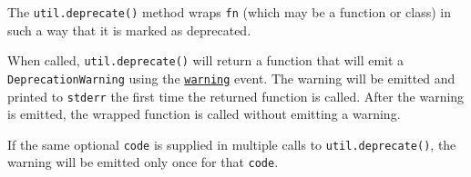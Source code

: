 The \texttt{util.deprecate()} method wraps \texttt{fn} (which may be a
function or class) in such a way that it is marked as deprecated.

\begin{Shaded}
\begin{Highlighting}[]
\OperatorTok{=} \NormalTok{(}\NormalTok{)}\OperatorTok{;}

 \OperatorTok{=}\NormalTok{(() }\KeywordTok{=\textgreater{}}\NormalTok{ \{}
\NormalTok{\}}\OperatorTok{,} \NormalTok{)}\OperatorTok{;}
\end{Highlighting}
\end{Shaded}

When called, \texttt{util.deprecate()} will return a function that will
emit a \texttt{DeprecationWarning} using the
\href{process.md\#event-warning}{\texttt{\textquotesingle{}warning\textquotesingle{}}}
event. The warning will be emitted and printed to \texttt{stderr} the
first time the returned function is called. After the warning is
emitted, the wrapped function is called without emitting a warning.

If the same optional \texttt{code} is supplied in multiple calls to
\texttt{util.deprecate()}, the warning will be emitted only once for
that \texttt{code}.

\begin{Shaded}
\begin{Highlighting}[]
\OperatorTok{=} \NormalTok{(}\NormalTok{)}\OperatorTok{;}

\OperatorTok{=}\OperatorTok{,}\OperatorTok{,} \NormalTok{)}\OperatorTok{;}
\OperatorTok{=}\OperatorTok{,}\OperatorTok{,} \NormalTok{)}\OperatorTok{;}
\NormalTok{()}\OperatorTok{;} 
\NormalTok{()}\OperatorTok{;} 
\end{Highlighting}
\end{Shaded}

